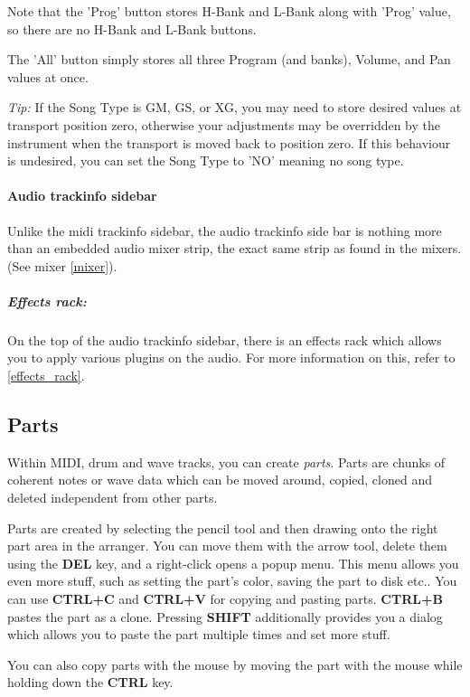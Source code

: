 \documentclass[a4paper]{report}
\newcommand{\key}[1]{\textbf{#1}}
\begin{document}
Note that the 'Prog' button stores H-Bank and L-Bank along with
'Prog' value, so there are no H-Bank and L-Bank buttons.

The 'All' button simply stores all three Program (and banks), Volume,
and Pan values at once.

\emph{Tip:} If the Song Type is GM, GS, or XG, you may need to store           %
desired values at transport position zero, otherwise your adjustments
may be overridden by the instrument when the transport is moved back
to position zero. If this behaviour is undesired, you can set the 
Song Type to 'NO' meaning no song type.                                        %

\paragraph{Audio trackinfo sidebar}
Unlike the midi trackinfo sidebar, the audio trackinfo side bar
is nothing more than an embedded audio mixer strip, the exact same 
strip as found in the mixers. (See mixer \ref{mixer}).
\subparagraph{Effects rack:}
On the top of the audio trackinfo sidebar, there is an effects rack
which allows you to apply various plugins on the audio. For more
information on this, refer to \ref{effects_rack}.


\subsection{Parts}
Within MIDI, drum and wave tracks, you can create \emph{parts}. Parts
are chunks of coherent notes or wave data which can be moved around,
copied, cloned and deleted independent from other parts.

Parts are created by selecting the pencil tool and then drawing onto
the right part area in the arranger. You can move them with the arrow
tool, delete them using the \key{DEL} key, and a right-click opens
a popup menu. This menu allows you even more stuff, such as setting
the part's color, saving the part to disk etc.. You can use
\key{CTRL+C} and \key{CTRL+V} for copying and pasting parts.
\key{CTRL+B} pastes the part as a clone. Pressing \key{SHIFT}
additionally provides you a dialog which allows you to paste the part
multiple times and set more stuff.

You can also copy parts with the mouse by moving the part with the mouse
while holding down the \key{CTRL} key.
\end{document}
